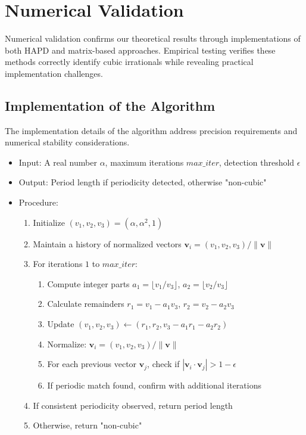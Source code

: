 \section{Numerical Validation}\label{sec:numerical_validation}

Numerical validation confirms our theoretical results through implementations of both HAPD and matrix-based approaches. Empirical testing verifies these methods correctly identify cubic irrationals while revealing practical implementation challenges.

\subsection{Implementation of the \HAPD{} Algorithm}

The implementation details of the \HAPD{} algorithm address precision requirements and numerical stability considerations.

\begin{algorithm_def}
\begin{itemize}
\item Input: A real number $\alpha$, maximum iterations $max\_iter$, detection threshold $\epsilon$
\item Output: Period length if periodicity detected, otherwise "non-cubic"
\item Procedure:
\begin{enumerate}
\item Initialize $(v_1, v_2, v_3) = (\alpha, \alpha^2, 1)$
\item Maintain a history of normalized vectors $\mathbf{v}_i = (v_1, v_2, v_3)/\|\mathbf{v}\|$
\item For iterations $1$ to $max\_iter$:
\begin{enumerate}
\item Compute integer parts $a_1 = \lfloor v_1/v_3 \rfloor$, $a_2 = \lfloor v_2/v_3 \rfloor$
\item Calculate remainders $r_1 = v_1 - a_1v_3$, $r_2 = v_2 - a_2v_3$
\item Update $(v_1, v_2, v_3) \leftarrow (r_1, r_2, v_3 - a_1r_1 - a_2r_2)$
\item Normalize: $\mathbf{v}_i = (v_1, v_2, v_3)/\|\mathbf{v}\|$
\item For each previous vector $\mathbf{v}_j$, check if $|\mathbf{v}_i \cdot \mathbf{v}_j| > 1 - \epsilon$
\item If periodic match found, confirm with additional iterations
\end{enumerate}
\item If consistent periodicity observed, return period length
\item Otherwise, return "non-cubic"
\end{enumerate}
\end{itemize}
\end{algorithm_def}

